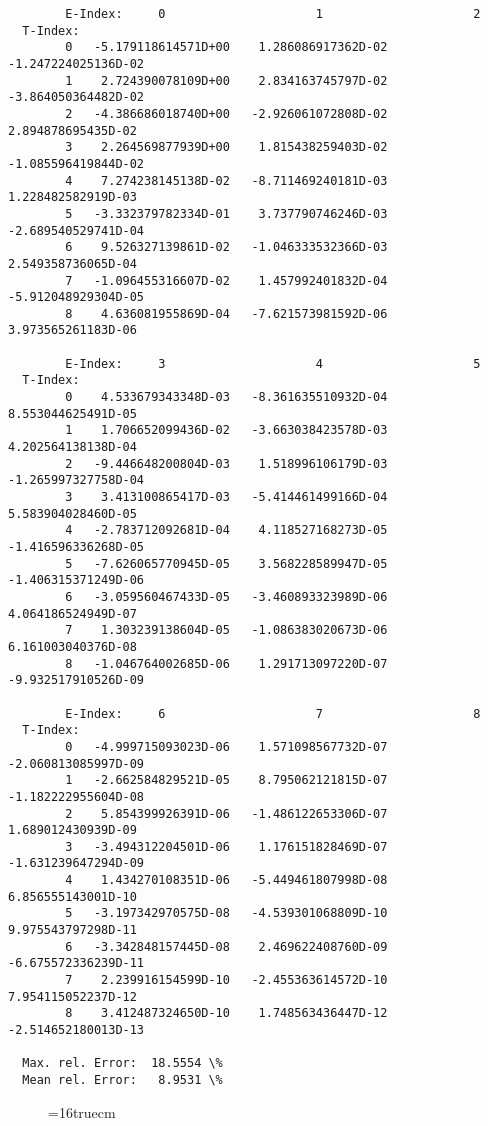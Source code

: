 \documentclass[12pt,dvipdfmx]{article}
\begin{document}
\begin{small}\begin{verbatim}
        E-Index:     0                     1                     2
  T-Index:
        0   -5.179118614571D+00    1.286086917362D-02   -1.247224025136D-02
        1    2.724390078109D+00    2.834163745797D-02   -3.864050364482D-02
        2   -4.386686018740D+00   -2.926061072808D-02    2.894878695435D-02
        3    2.264569877939D+00    1.815438259403D-02   -1.085596419844D-02
        4    7.274238145138D-02   -8.711469240181D-03    1.228482582919D-03
        5   -3.332379782334D-01    3.737790746246D-03   -2.689540529741D-04
        6    9.526327139861D-02   -1.046333532366D-03    2.549358736065D-04
        7   -1.096455316607D-02    1.457992401832D-04   -5.912048929304D-05
        8    4.636081955869D-04   -7.621573981592D-06    3.973565261183D-06

        E-Index:     3                     4                     5
  T-Index:
        0    4.533679343348D-03   -8.361635510932D-04    8.553044625491D-05
        1    1.706652099436D-02   -3.663038423578D-03    4.202564138138D-04
        2   -9.446648200804D-03    1.518996106179D-03   -1.265997327758D-04
        3    3.413100865417D-03   -5.414461499166D-04    5.583904028460D-05
        4   -2.783712092681D-04    4.118527168273D-05   -1.416596336268D-05
        5   -7.626065770945D-05    3.568228589947D-05   -1.406315371249D-06
        6   -3.059560467433D-05   -3.460893323989D-06    4.064186524949D-07
        7    1.303239138604D-05   -1.086383020673D-06    6.161003040376D-08
        8   -1.046764002685D-06    1.291713097220D-07   -9.932517910526D-09

        E-Index:     6                     7                     8
  T-Index:
        0   -4.999715093023D-06    1.571098567732D-07   -2.060813085997D-09
        1   -2.662584829521D-05    8.795062121815D-07   -1.182222955604D-08
        2    5.854399926391D-06   -1.486122653306D-07    1.689012430939D-09
        3   -3.494312204501D-06    1.176151828469D-07   -1.631239647294D-09
        4    1.434270108351D-06   -5.449461807998D-08    6.856555143001D-10
        5   -3.197342970575D-08   -4.539301068809D-10    9.975543797298D-11
        6   -3.342848157445D-08    2.469622408760D-09   -6.675572336239D-11
        7    2.239916154599D-10   -2.455363614572D-10    7.954115052237D-12
        8    3.412487324650D-10    1.748563436447D-12   -2.514652180013D-13

  Max. rel. Error:  18.5554 \%
  Mean rel. Error:   8.9531 \%

\end{verbatim}\end{small}
\begin{figure} \label{2.0c}
\epsfxsize=16truecm
\end{figure}
\newpage
\end{document}
